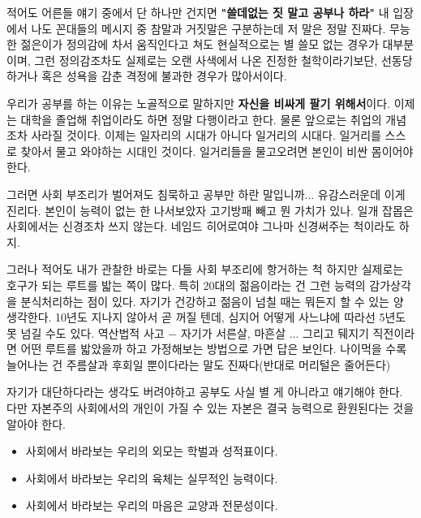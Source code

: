 \vspace{5mm}

적어도 어른들 얘기 중에서 단 하나만 건지면 \textbf{"쓸데없는 짓 말고 공부나 하라"}
내 입장에서 나도 꼰대들의 메시지 중 참말과 거짓말은 구분하는데 저 말은 정말 진짜다.
무능한 젊은이가 정의감에 차서 움직인다고 쳐도 현실적으로는 별 쓸모 없는 경우가 대부분이며,
그런 정의감조차도 실제로는 오랜 사색에서 나온 진정한 철학이라기보단, 선동당하거나 혹은 성욕을 감춘 격정에 불과한 경우가 많아서이다.
\vspace{5mm}

우리가 공부를 하는 이유는 노골적으로 말하지만 \textbf{자신을 비싸게 팔기 위해서}이다.
이제는 대학을 졸업해 취업이라도 하면 정말 다행이라고 한다. 물론 앞으로는 취업의 개념조차 사라질 것이다.
이제는 일자리의 시대가 아니다 일거리의 시대다. 일거리를 스스로 찾아서 물고 와야하는 시대인 것이다.
일거리들을 물고오려면 본인이 비싼 몸이어야 한다.
\vspace{5mm}

그러면 사회 부조리가 벌어져도 침묵하고 공부만 하란 말입니까... 유감스러운데 이게 진리다.
본인이 능력이 없는 한 나서보았자 고기방패 빼고 뭔 가치가 있나.
일개 잡몹은 사회에서는 신경조차 쓰지 않는다. 네임드 히어로여야 그나마 신경써주는 척이라도 하지.
\vspace{5mm}

그러나 적어도 내가 관찰한 바로는 다들 사회 부조리에 항거하는 척 하지만 실제로는 호구가 되는 루트를 밟는 쪽이 많다.
특히 20대의 젊음이라는 건 그런 능력의 감가상각을 분식처리하는 점이 있다. 자기가 건강하고 젊음이 넘칠 때는 뭐든지 할 수 있는 양 생각한다.
10년도 지나지 않아서 곧 꺼질 텐데, 심지어 어떻게 사느냐에 따라선 5년도 못 넘길 수도 있다.
역산법적 사고 $-$ 자기가 서른살, 마흔살 ... 그리고 뒈지기 직전이라면 어떤 루트를 밟았을까 하고 가정해보는 방법으로 가면 답은 보인다.
나이먹을 수록 늘어나는 건 주름살과 후회일 뿐이다라는 말도 진짜다(반대로 머리털은 줄어든다)
\vspace{5mm}

자기가 대단하다라는 생각도 버려야하고 공부도 사실 별 게 아니라고 얘기해야 한다.
다만 자본주의 사회에서의 개인이 가질 수 있는 자본은 결국 능력으로 환원된다는 것을 알아야 한다.
\begin{itemize}
    \item 사회에서 바라보는 우리의 외모는 학벌과 성적표이다.
    \item 사회에서 바라보는 우리의 육체는 실무적인 능력이다.
    \item 사회에서 바라보는 우리의 마음은 교양과 전문성이다.
\end{itemize}
\vspace{5mm}

